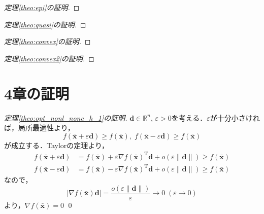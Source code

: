 \documentclass[dvipdfmx]{jsreport}
\begin{document}
\begin{proof}[定理\ref{theo:epi}の証明]

\end{proof}

\begin{proof}[定理\ref{theo:quasi}の証明]

\end{proof}

\begin{proof}[定理\ref{theo:convex}の証明]

\end{proof}

\begin{proof}[定理\ref{theo:convex2}の証明]

\end{proof}

\section{4章の証明}
\begin{proof}[定理\ref{theo:opt_nonl_nonc_h_1}の証明]
  $\bm{d} \in \mathbb{R}^n, \, \varepsilon > 0$を考える．$\varepsilon$が十分小さければ，局所最適性より，
  \begin{equation}
    f(\bar{\bm{x}} + \varepsilon \bm{d}) \geq f(\bar{\bm{x}}), \; f(\bar{\bm{x}} - \varepsilon \bm{d}) \geq f(\bar{\bm{x}}) \nonumber
  \end{equation}
  が成立する．Taylorの定理より，
  \begin{align}
    f(\bar{\bm{x}} + \varepsilon \bm{d}) &= f(\bar{\bm{x}}) + \varepsilon \nabla f(\bar{\bm{x}})^{\mathrm{T}}\bm{d} + o(\varepsilon\|\bm{d}\|) \geq f(\bar{\bm{x}}) \nonumber \\
    f(\bar{\bm{x}} - \varepsilon \bm{d}) &= f(\bar{\bm{x}}) - \varepsilon \nabla f(\bar{\bm{x}})^{\mathrm{T}}\bm{d} + o(\varepsilon\|\bm{d}\|) \geq f(\bar{\bm{x}}) \nonumber
  \end{align}
  なので，
  \begin{equation}
    |\nabla f(\bar{\bm{x}})\bm{d}| = \frac{o(\varepsilon \|\bm{d}\|)}{\varepsilon} \rightarrow 0 \; (\varepsilon \rightarrow 0) \nonumber
  \end{equation}
  より，$\nabla f(\bar{\bm{x}}) = 0$ \qed
\end{proof}
\end{document}
